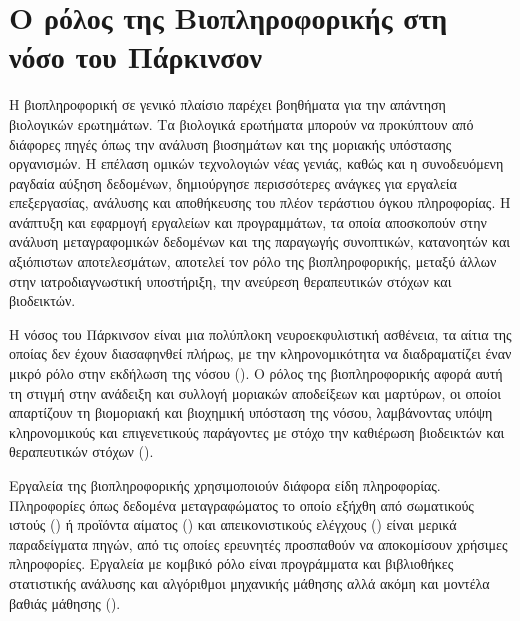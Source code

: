 \documentclass[12pt]{report}
\begin{document}
        \section{Ο ρόλος της Βιοπληροφορικής στη νόσο του Πάρκινσον}
        Η βιοπληροφορική σε γενικό πλαίσιο παρέχει βοηθήματα για την απάντηση βιολογικών ερωτημάτων. Τα βιολογικά ερωτήματα μπορούν να προκύπτουν από διάφορες πηγές όπως την ανάλυση βιοσημάτων και της μοριακής υπόστασης οργανισμών. Η επέλαση ομικών τεχνολογιών νέας γενιάς, καθώς και η συνοδευόμενη ραγδαία αύξηση δεδομένων, δημιούργησε περισσότερες ανάγκες για εργαλεία επεξεργασίας, ανάλυσης και αποθήκευσης του πλέον τεράστιου όγκου πληροφορίας. Η ανάπτυξη και εφαρμογή εργαλείων και προγραμμάτων, τα οποία αποσκοπούν στην ανάλυση μεταγραφομικών δεδομένων και της παραγωγής συνοπτικών, κατανοητών και αξιόπιστων αποτελεσμάτων, αποτελεί τον ρόλο της βιοπληροφορικής, μεταξύ άλλων στην ιατροδιαγνωστική υποστήριξη, την ανεύρεση θεραπευτικών στόχων και βιοδεικτών.
        \par
         H νόσος του Πάρκινσον είναι μια πολύπλοκη νευροεκφυλιστική ασθένεια, τα αίτια της οποίας δεν έχουν διασαφηνθεί πλήρως, με την κληρονομικότητα να διαδραματίζει έναν μικρό ρόλο στην εκδήλωση της νόσου (\emph{\cite{Scholz2012GenomicsDisease}}). Ο ρόλος της βιοπληροφορικής αφορά αυτή τη στιγμή στην ανάδειξη και συλλογή μοριακών αποδείξεων και μαρτύρων, οι οποίοι απαρτίζουν τη βιομοριακή και βιοχημική υπόσταση της νόσου, λαμβάνοντας υπόψη κληρονομικούς και επιγενετικούς παράγοντες με στόχο την καθιέρωση βιοδεικτών και θεραπευτικών στόχων (\emph{\cite{Krokidis2019IdentificationAnalysis}}).
         \par
         Εργαλεία της βιοπληροφορικής χρησιμοποιούν διάφορα είδη πληροφορίας. Πληροφορίες όπως δεδομένα μεταγραφώματος το οποίο εξήχθη από σωματικούς ιστούς (\emph{\cite{Planken2017LookingSkin}}) ή προϊόντα αίματος (\emph{\cite{Wang2022BioinformaticsDisease}}) και απεικονιστικούς ελέγχους (\emph{\cite{Salvatore2014MachinePalsy}}) είναι μερικά παραδείγματα πηγών, από τις οποίες ερευνητές προσπαθούν να αποκομίσουν χρήσιμες πληροφορίες. Εργαλεία με κομβικό ρόλο είναι προγράμματα και βιβλιοθήκες στατιστικής ανάλυσης και αλγόριθμοι μηχανικής μάθησης αλλά ακόμη και μοντέλα βαθιάς μάθησης (\emph{\cite{Wang2020EarlyLearning}}).
        
\end{document}
